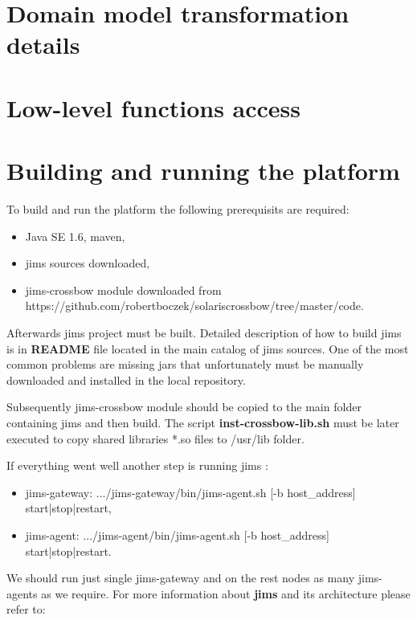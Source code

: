 \documentclass[11pt]{book}
\begin{document}
    \section{Domain model transformation details}
        


    \section{Low-level functions access}
	\label{sec:impl:low}


    \section{Building and running the platform}
	\label{sec:impl:build}

        		To build and run the platform the following prerequisits are required:
		\begin{itemize}
			\item{Java SE 1.6, maven,}
			\item{jims sources downloaded,}
			\item{jims-crossbow module downloaded from \\ https://github.com/robertboczek/solaris\-crossbow/tree/master/code.}
		\end{itemize}
		
		Afterwards jims project must be built. Detailed description of how to build jims is in \textbf{README} file located
		in the main catalog of jims sources. One of the most common problems are missing jars that unfortunately must be 
		manually downloaded and installed in the local repository.
		
		
		Subsequently jims-crossbow module should be copied to the main folder containing jims and then build. The script 
		\textbf{inst-crossbow-lib.sh} must be	later executed to copy shared libraries *.so files to /usr/lib folder.
		
		If everything went well another step is running jims :
		\begin{itemize}
			\item{jims-gateway: .../jims-gateway/bin/jims-agent.sh [-b host\_address] start|stop|restart,}
			\item{jims-agent: .../jims-agent/bin/jims-agent.sh [-b host\_address] start|stop|restart.}
		\end{itemize}
		
		We should run just single jims-gateway and on the rest nodes as many jims-agents as we require. For more information about \textbf{jims} 
		and its architecture please refer to:
		
\end{document}
